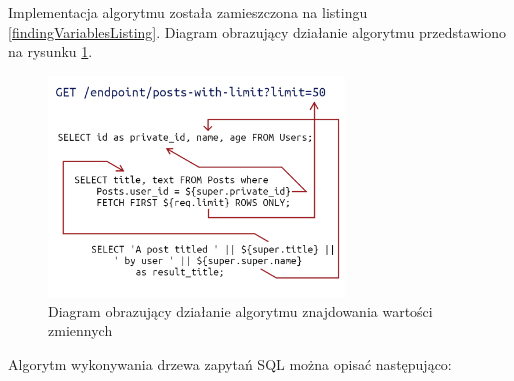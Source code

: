Implementacja algorytmu została zamieszczona na listingu
\ref{findingVariablesListing}. Diagram obrazujący działanie algorytmu
przedstawiono na rysunku \ref{variableResolutionFigure}.



\begin{figure}[h]
    \centering
    \includegraphics[width=0.7\textwidth]{./img/variable_resolution.png}
    \caption{Diagram obrazujący działanie algorytmu znajdowania wartości zmiennych}
    \label{variableResolutionFigure}
\end{figure}

Algorytm wykonywania drzewa zapytań SQL można opisać następująco:

